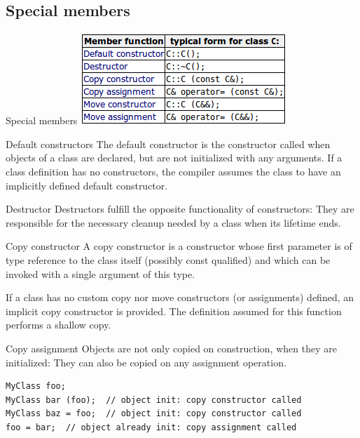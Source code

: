 \documentclass{beamer}
\begin{document}
\subsection{Special members}
\begin{frame}{Special members}
\includegraphics[scale=0.4]{img/SpecialMembers.png}
\end{frame}

\begin{frame}{Default constructors}
The default constructor is the constructor called when objects of a class are
declared, but are not initialized with any arguments. If a class definition has
no constructors, the compiler assumes the class to have an implicitly defined
default constructor.
\end{frame}

\begin{frame}{Destructor}
Destructors fulfill the opposite functionality of constructors: They are
responsible for the necessary cleanup needed by a class when its lifetime ends.
\end{frame}

\begin{frame}{Copy constructor}
A copy constructor is a constructor whose first parameter is of type reference
to the class itself (possibly const qualified) and which can be invoked with a
single argument of this type. 
\par
If a class has no custom copy nor move constructors (or assignments) defined, an
implicit copy constructor is provided. The definition assumed for this function
performs a shallow copy. 
\end{frame}

\begin{frame}[fragile]{Copy assignment}
Objects are not only copied on construction, when they are initialized: They can
also be copied on any assignment operation.
\begin{lstlisting}
MyClass foo;
MyClass bar (foo);  // object init: copy constructor called
MyClass baz = foo;  // object init: copy constructor called
foo = bar;  // object already init: copy assignment called
\end{lstlisting}
\end{frame}
\end{document}
